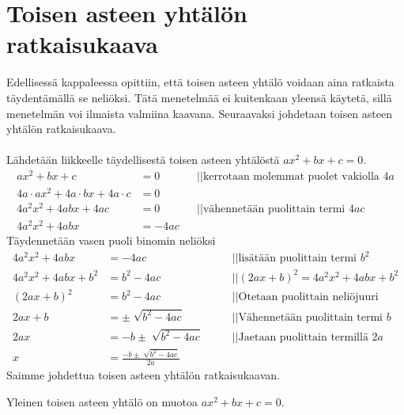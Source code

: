 \chapter{Toisen asteen yhtälön ratkaisukaava}
Edellisessä kappaleessa opittiin, että toisen asteen yhtälö voidaan aina ratkaista täydentämällä se neliöksi. Tätä menetelmää ei kuitenkaan yleensä käytetä, sillä menetelmän voi ilmaista valmiina kaavana. Seuraavaksi johdetaan toisen asteen yhtälön ratkaisukaava. \\ \\

Lähdetään liikkeelle täydellisestä toisen asteen yhtälöstä $ax^2+bx+c=0$.
\begin{align*}
ax^2+bx+c&=0 \ \ \ \ \ &&|| \text{kerrotaan molemmat puolet vakiolla }4a \\
4a \cdot ax^2+4a \cdot bx + 4a \cdot c&=0 \\
4a^2x^2+4abx+4ac&=0 \ \ \ \ \ &&|| \text{vähennetään puolittain termi }4ac  \\
4a^2x^2+4abx&=-4ac
\end{align*}
Täydennetään vasen puoli binomin neliöksi
\begin{align*}
4a^2x^2+4abx&=-4ac \ \ \ \ \ &&|| \text{lisätään puolittain termi } b^2 \\
4a^2x^2+4abx+b^2&=b^2-4ac \ \ \ \ \ &&||(2ax+b)^2=4a^2x^2+4abx+b^2 \\
(2ax+b)^2&=b^2-4ac  \ \ \ \ \ &&||\text{Otetaan puolittain neliöjuuri } \\
2ax+b&= \pm \sqrt[]{b^2-4ac} \ \ \ \ \ &&||\text{Vähennetään puolittain termi } b \\
2ax&=-b \pm \sqrt[]{b^2-4ac} \ \ \ \ \ &&||\text{Jaetaan puolittain termillä } 2a \\
x&= \frac{-b \pm \sqrt[]{b^2-4ac}}{2a} 
\end{align*}
Saimme johdettua toisen asteen yhtälön ratkaisukaavan. \\ 

Yleinen toisen asteen yhtälö on muotoa $ax^2+bx+c=0$.


